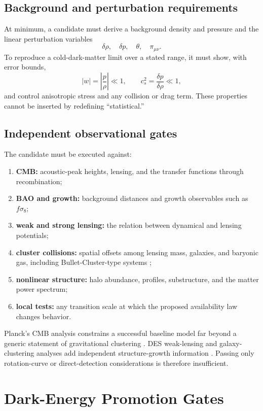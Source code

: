 \documentclass[11pt]{article}
\begin{document}
\subsection{Background and perturbation requirements}

At minimum, a candidate must derive a background density and pressure and the
linear perturbation variables
\[
\delta\rho,\quad \delta p,\quad \theta,\quad \pi_{\mu\nu}.
\]
To reproduce a cold-dark-matter limit over a stated range, it must show, with
error bounds,
\[
|w|=\left|\frac{p}{\rho}\right|\ll1,\qquad
c_s^2=\frac{\delta p}{\delta\rho}\ll1,
\]
and control anisotropic stress and any collision or drag term.  These
properties cannot be inserted by redefining ``statistical.''

\subsection{Independent observational gates}

The candidate must be executed against:
\begin{enumerate}[label=\textbf{DM\arabic*.}]
\item \textbf{CMB:} acoustic-peak heights, lensing, and the transfer functions
through recombination;
\item \textbf{BAO and growth:} background distances and growth observables
such as $f\sigma_8$;
\item \textbf{weak and strong lensing:} the relation between dynamical and
lensing potentials;
\item \textbf{cluster collisions:} spatial offsets among lensing mass,
galaxies, and baryonic gas, including Bullet-Cluster-type systems
\cite{Clowe2006BulletCluster};
\item \textbf{nonlinear structure:} halo abundance, profiles, substructure,
and the matter power spectrum;
\item \textbf{local tests:} any transition scale at which the proposed
availability law changes behavior.
\end{enumerate}

Planck's CMB analysis constrains a successful baseline model far beyond a
generic statement of gravitational clustering
\cite{Planck2018CosmologicalParameters}.  DES weak-lensing and galaxy-clustering
analyses add independent structure-growth information
\cite{DESY3Cosmology}.  Passing only rotation-curve or direct-detection
considerations is therefore insufficient.

\section{Dark-Energy Promotion Gates}
\end{document}
